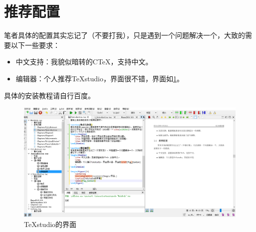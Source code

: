 \section{推荐配置}
笔者具体的配置其实忘记了（不要打我），只是遇到一个问题解决一个，大致的需要以下一些要求：
\begin{itemize}
	\item 中文支持：我貌似暗转的CTeX，支持中文。
	\item 编辑器：个人推荐TeXstudio，界面很不错，界面如\cref{fig_jiemian}。
\end{itemize}

具体的安装教程请自行百度。
\begin{figure}[h]
	\centering
	\includegraphics[width=1.0\linewidth]{Images/jiemian.png}
	\caption{TeXstudio的界面}
	\label{fig_jiemian}
\end{figure}

